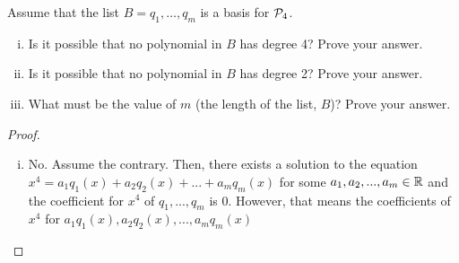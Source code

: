 \begin{question}
	\normalfont
	Assume that the list $B= q_1, \dots, q_m $ \hspace{.1cm} is a basis for $\P_4$.
	\begin{enumerate}[(i)]
		\item Is it possible that no polynomial in $B$ has degree 4? Prove your answer.
		\item Is it possible that no polynomial in $B$ has degree 2? Prove your answer.
		\item What must be the value of $m$ (the length of the list, $B$)?  Prove your answer. \\
	\end{enumerate}
\end{question}
\renewcommand{\qedsymbol}{$\blacksquare$}
\begin{proof}
    \begin{enumerate}[(i)]
        \item No. Assume the contrary. Then, there exists a solution to the equation $x^4=a_1q_1(x)+a_2q_2(x)+...+a_mq_m(x)$ for some $a_1,a_2,...,a_m\in\R$ and the coefficient for $x^4$ of $q_1,...,q_m$ is $0$.
        However, that means the coefficients of $x^4$ for $a_1q_1(x),a_2q_2(x),...,a_mq_m(x)$ 
    \end{enumerate}
    \renewcommand{\qedsymbol}{}
\end{proof}